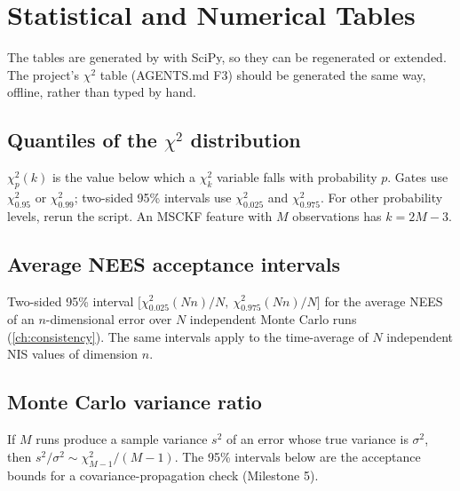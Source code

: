 \chapter{Statistical and Numerical Tables}
\label{app:tables}

The tables are generated by  with SciPy, so they can be regenerated or extended. The project's
 $\chi^2$ table (AGENTS.md F3) should be generated the same way, offline, rather than typed by hand.

\section*{Quantiles of the \texorpdfstring{$\chi^2$}{chi-squared} distribution}

$\chi^2_p(k)$ is the value below which a $\chi^2_k$ variable falls with probability $p$. Gates use $\chi^2_{0.95}$ or $\chi^2_{0.99}$; two-sided
95\% intervals use $\chi^2_{0.025}$ and $\chi^2_{0.975}$. For other probability levels, rerun the script. An MSCKF feature with $M$
observations has $k = 2M - 3$.

\begin{center}
\footnotesize\setlength{\tabcolsep}{3.2pt}

\end{center}

\section*{Average NEES acceptance intervals}

Two-sided 95\% interval $\big[\chi^2_{0.025}(Nn)/N,\ \chi^2_{0.975}(Nn)/N\big]$ for the average NEES of an $n$-dimensional error over $N$ independent
Monte Carlo runs (\cref{ch:consistency}). The same intervals apply to the time-average of $N$ independent NIS values of dimension $n$.

\begin{center}
\small\setlength{\tabcolsep}{4pt}

\end{center}

\section*{Monte Carlo variance ratio}

If $M$ runs produce a sample variance $s^2$ of an error whose true variance is $\sigma^2$, then $s^2/\sigma^2 \sim \chi^2_{M-1}/(M-1)$. The 95\%
intervals below are the acceptance bounds for a covariance-propagation check (Milestone 5).

